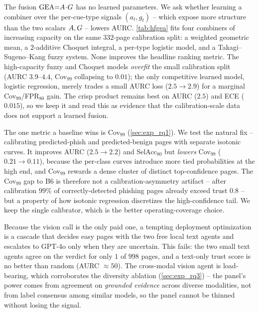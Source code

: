 The fusion $\mathrm{GEA}{=}A\!\cdot\!G$ has no learned parameters. We ask whether learning
a combiner over the per-cue-type signals $(a_t,g_t)$ -- which expose more structure than the
two scalars $A,G$ -- lowers AURC. \autoref{tab:hfgea} fits four combiners of increasing
capacity on the same $332$-page calibration split: a weighted geometric mean, a $2$-additive
Choquet integral, a per-type logistic model, and a Takagi--Sugeno--Kang fuzzy system. None
improves the headline ranking metric. The high-capacity fuzzy and Choquet models
\emph{overfit} the small calibration split (AURC $3.9$--$4.4$, Cov$_{99}$ collapsing to
$0.01$); the only competitive learned model, logistic regression, merely trades a small
AURC loss ($2.5\to2.9$) for a marginal Cov$_{99}$/FPR$_{80}$ gain. The crisp product remains
best on AURC ($2.5$) and ECE ($0.015$), so we keep it and read this as evidence that the
calibration-scale data does not support a learned fusion.


The one metric a baseline wins is Cov$_{99}$ (\autoref{sec:exp_rq1}). We test the natural
fix -- calibrating predicted-phish and predicted-benign pages with separate isotonic curves.
It improves AURC ($2.5\to2.2$) and SelAcc$_{80}$ but \emph{lowers} Cov$_{99}$ ($0.21\to0.11$),
because the per-class curves introduce more tied probabilities at the high end, and Cov$_{99}$
rewards a dense cluster of distinct top-confidence pages. The Cov$_{99}$ gap to B6 is therefore
not a calibration-asymmetry artifact -- after calibration $99\%$ of correctly-detected
phishing pages already exceed trust $0.8$ -- but a property of how isotonic regression
discretizes the high-confidence tail. We keep the single calibrator, which is the better
operating-coverage choice.

Because the vision call is the only paid one, a tempting deployment optimization is a cascade
that decides easy pages with the two free local text agents and escalates to GPT-4o only when
they are uncertain. This fails: the two small text agents agree on the verdict for only
$1$ of $998$ pages, and a text-only trust score is no better than random (AURC $\approx50$).
The cross-modal vision agent is load-bearing, which corroborates the diversity ablation
(\autoref{sec:exp_rq3}) -- the panel's power comes from agreement on \emph{grounded evidence}
across diverse modalities, not from label consensus among similar models, so the panel cannot
be thinned without losing the signal.

